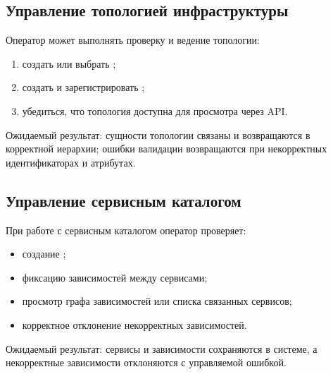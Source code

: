 \documentclass[12pt,a4paper]{extarticle}
\begin{document}
\subsection{Управление топологией инфраструктуры}

\begin{hseExample}
Оператор может выполнять проверку и ведение топологии:

\begin{enumerate}[label=\arabic*), leftmargin=1.25cm]
    \item создать или выбрать ;
    \item создать  и зарегистрировать ;
    \item убедиться, что топология доступна для просмотра через API.
\end{enumerate}

Ожидаемый результат: сущности топологии связаны и возвращаются в корректной иерархии; ошибки валидации возвращаются при некорректных идентификаторах и атрибутах.
\end{hseExample}

\subsection{Управление сервисным каталогом}

\begin{hseExample}
При работе с сервисным каталогом оператор проверяет:

\begin{itemize}[leftmargin=1.25cm]
    \item создание ;
    \item фиксацию зависимостей между сервисами;
    \item просмотр графа зависимостей или списка связанных сервисов;
    \item корректное отклонение некорректных зависимостей.
\end{itemize}

Ожидаемый результат: сервисы и зависимости сохраняются в системе, а некорректные зависимости отклоняются с управляемой ошибкой.
\end{hseExample}
\end{document}
